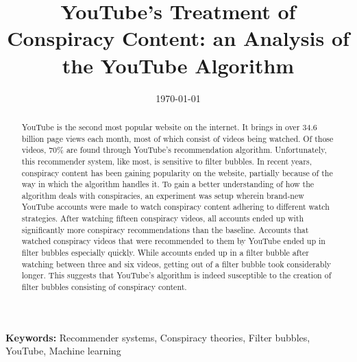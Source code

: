 \documentclass{uva-inf-article}
\title{YouTube's Treatment of Conspiracy Content: an Analysis of the YouTube Algorithm}
\date{\today}
\begin{document}
\maketitle

\begin{abstract}
    YouTube is the second most popular website on the internet. It brings in over 34.6 billion page views each
    month, most of which consist of videos being watched. Of those videos, 70\% are found through YouTube's
    recommendation algorithm. Unfortunately, this recommender system, like most, is sensitive to filter bubbles.
    In recent years, conspiracy content has been gaining popularity on the website, partially because of the way
    in which the algorithm handles it. To gain a better understanding of how the algorithm deals with
    conspiracies, an experiment was setup wherein brand-new YouTube accounts were made to watch conspiracy
    content adhering to different watch strategies. After watching fifteen conspiracy videos, all accounts ended
    up with significantly more conspiracy recommendations than the baseline. Accounts that watched conspiracy 
    videos that were recommended to them by YouTube ended up in filter bubbles especially quickly. While
    accounts ended up in a filter bubble after watching between three and six videos, getting out of a filter
    bubble took considerably longer. This suggests that YouTube's algorithm is indeed susceptible to the
    creation of filter bubbles consisting of conspiracy content. 
\end{abstract}

{\bf Keywords:} Recommender systems, Conspiracy theories, Filter bubbles, YouTube, Machine learning

\linenumbers













\newpage

\nolinenumbers
 

\newpage


\end{document}
